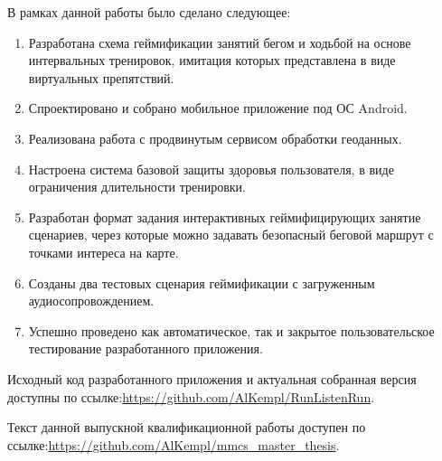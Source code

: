 \Conc
В рамках данной работы было сделано следующее:
\begin{enumerate}
	\item Разработана схема геймификации занятий бегом и ходьбой на основе интервальных тренировок, имитация которых представлена в виде виртуальных препятствий.
	\item Спроектировано и собрано мобильное приложение под ОС Android.
	\item Реализована работа с продвинутым сервисом обработки геоданных.
	\item Настроена система базовой защиты здоровья пользователя, в виде ограничения длительности тренировки.
	\item Разработан формат задания интерактивных геймифицирующих занятие сценариев, через которые можно задавать безопасный беговой маршрут с точками интереса на карте.
	\item Созданы два тестовых сценария геймификации с загруженным аудиосопровождением.
	\item Успешно проведено как автоматическое, так и закрытое пользовательское тестирование разработанного приложения.
\end{enumerate} 
\smallskip

Исходный код разработанного приложения и актуальная собранная версия доступны по ссылке:\space\url{https://github.com/AlKempl/RunListenRun}.


Текст данной выпускной квалификационной работы доступен по ссылке:\space\url{https://github.com/AlKempl/mmcs_master_thesis}.


